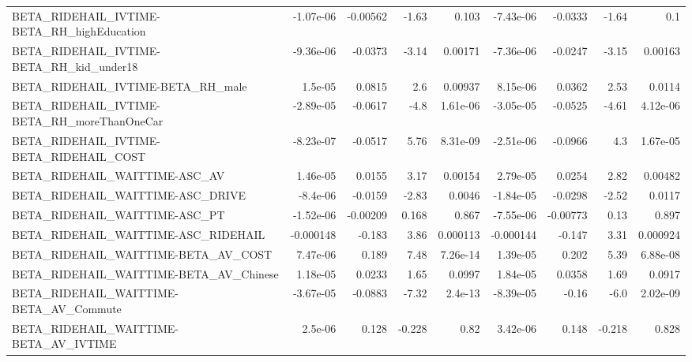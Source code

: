 \begin{tabular}{lrrrrrrrr}
BETA\_RIDEHAIL\_IVTIME-BETA\_RH\_highEducation         &   -1.07e-06 &     -0.00562 &     -1.63 &    0.103 &  -7.43e-06 &     -0.0333 &        -1.64 &           0.1 \\
BETA\_RIDEHAIL\_IVTIME-BETA\_RH\_kid\_under18           &   -9.36e-06 &      -0.0373 &     -3.14 &  0.00171 &  -7.36e-06 &     -0.0247 &        -3.15 &       0.00163 \\
BETA\_RIDEHAIL\_IVTIME-BETA\_RH\_male                  &     1.5e-05 &       0.0815 &       2.6 &  0.00937 &   8.15e-06 &      0.0362 &         2.53 &        0.0114 \\
BETA\_RIDEHAIL\_IVTIME-BETA\_RH\_moreThanOneCar        &   -2.89e-05 &      -0.0617 &      -4.8 & 1.61e-06 &  -3.05e-05 &     -0.0525 &        -4.61 &      4.12e-06 \\
BETA\_RIDEHAIL\_IVTIME-BETA\_RIDEHAIL\_COST            &   -8.23e-07 &      -0.0517 &      5.76 & 8.31e-09 &  -2.51e-06 &     -0.0966 &          4.3 &      1.67e-05 \\
BETA\_RIDEHAIL\_WAITTIME-ASC\_AV                      &    1.46e-05 &       0.0155 &      3.17 &  0.00154 &   2.79e-05 &      0.0254 &         2.82 &       0.00482 \\
BETA\_RIDEHAIL\_WAITTIME-ASC\_DRIVE                   &    -8.4e-06 &      -0.0159 &     -2.83 &   0.0046 &  -1.84e-05 &     -0.0298 &        -2.52 &        0.0117 \\
BETA\_RIDEHAIL\_WAITTIME-ASC\_PT                      &   -1.52e-06 &     -0.00209 &     0.168 &    0.867 &  -7.55e-06 &    -0.00773 &         0.13 &         0.897 \\
BETA\_RIDEHAIL\_WAITTIME-ASC\_RIDEHAIL                &   -0.000148 &       -0.183 &      3.86 & 0.000113 &  -0.000144 &      -0.147 &         3.31 &      0.000924 \\
BETA\_RIDEHAIL\_WAITTIME-BETA\_AV\_COST                &    7.47e-06 &        0.189 &      7.48 & 7.26e-14 &   1.39e-05 &       0.202 &         5.39 &      6.88e-08 \\
BETA\_RIDEHAIL\_WAITTIME-BETA\_AV\_Chinese             &    1.18e-05 &       0.0233 &      1.65 &   0.0997 &   1.84e-05 &      0.0358 &         1.69 &        0.0917 \\
BETA\_RIDEHAIL\_WAITTIME-BETA\_AV\_Commute             &   -3.67e-05 &      -0.0883 &     -7.32 &  2.4e-13 &  -8.39e-05 &       -0.16 &         -6.0 &      2.02e-09 \\
BETA\_RIDEHAIL\_WAITTIME-BETA\_AV\_IVTIME              &     2.5e-06 &        0.128 &    -0.228 &     0.82 &   3.42e-06 &       0.148 &       -0.218 &         0.828 \\

\end{tabular}
